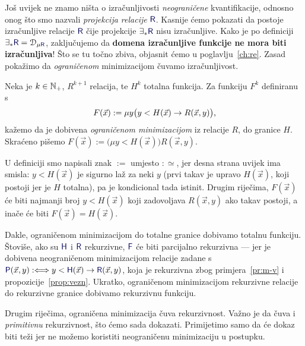 Još uvijek ne znamo ništa o izračunljivosti \emph{neograničene} kvantifikacije, odnosno onog što smo nazvali \emph{projekcija relacije} $\f R$. Kasnije ćemo pokazati da postoje izračunljive relacije $\f R$ čije projekcije $\exists_*\f R$ nisu izračunljive. Kako je po definiciji $\exists_*\f R=\dom{\mu\f R}$, zaključujemo da \textbf{domena izračunljive funkcije ne mora biti izračunljiva}! Što se tu točno zbiva, objasnit ćemo u poglavlju~\ref{ch:re}. Zasad pokažimo da \emph{ograničenom} minimizacijom čuvamo izračunljivost.


\begin{definicija}
Neka je $k\in{\mathbb N}_+$, $R^{k+1}$ relacija, te $H^k$ totalna funkcija. Za funkciju $F^k$ definiranu s
\begin{equation}
    F(\vec x):=\mu y\bigl(y<H(\vec x)\to R(\vec x,y)\bigr)\text,
\end{equation}
kažemo da je dobivena \emph{ograničenom minimizacijom} iz relacije $R$, do granice $H$. Skraćeno pišemo $F(\vec x):=\bigl(\mu y<H(\vec x)\bigr)R(\vec x,y)$.
\end{definicija}

\begin{napomena}\label{nap:min=H}
U definiciji smo napisali znak $:=$ umjesto $:\simeq$, jer desna strana uvijek ima smisla: $y<H(\vec x)$ je sigurno laž za neki $y$ (prvi takav je upravo $H(\vec x)$, koji postoji jer je $H$ totalna), pa je kondicional tada istinit. Drugim riječima, $F(\vec x)$ će biti najmanji broj $y<H(\vec x)$ koji zadovoljava $R(\vec x,y)$ ako takav postoji, a inače će biti $F(\vec x)=H(\vec x)$.

Dakle, ograničenom minimizacijom do totalne granice dobivamo totalnu funkciju. Štoviše, ako su $\f H$ i $\f R$ rekurzivne, $\f F$ će biti parcijalno rekurzivna --- jer je dobivena neograničenom minimizacijom relacije zadane s $\f P(\vec x,y):\Longleftrightarrow y<\f H(\vec x)\to\f R(\vec x,y)$, koja je rekurzivna zbog primjera~\ref{pr:m-v} i propozicije~\ref{prop:vezn}. Ukratko, ograničenom minimizacijom rekurzivne relacije do rekurzivne granice
dobivamo rekurzivnu funkciju.
\end{napomena}

Drugim riječima, ograničena minimizacija čuva rekurzivnost. Važno je da čuva i \emph{primitivnu} rekurzivnost, što ćemo sada dokazati. Primijetimo samo da će dokaz biti teži jer ne možemo koristiti neograničenu minimizaciju u postupku.

